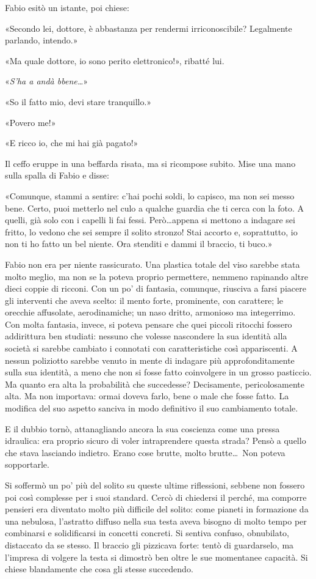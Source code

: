 Fabio esitò un istante, poi chiese:

«Secondo lei, dottore, è abbastanza per rendermi irriconoscibile? Legalmente parlando, intendo.»

«Ma quale dottore, io sono perito elettronico!», ribatté lui.

«\textit{S'ha a andà bbene\ldots}»

«So il fatto mio, devi stare tranquillo.»

«Povero me!»

«E ricco io, che mi hai già pagato!»

Il ceffo eruppe in una beffarda risata, ma si ricompose subito. Mise una mano sulla spalla di Fabio e disse:

«Comunque, stammi a sentire: c'hai pochi soldi, lo capisco, ma non sei messo bene. Certo, puoi metterlo nel culo a qualche guardia che ti cerca con la foto. A quelli, già solo con i capelli li fai fessi. Però\ldots appena si mettono a indagare sei fritto, lo vedono che sei sempre il solito stronzo! Stai accorto e, soprattutto, io non ti ho fatto un bel niente. Ora stenditi e dammi il braccio, ti buco.»

Fabio non era per niente rassicurato. Una plastica totale del viso sarebbe stata molto meglio, ma non se la poteva proprio permettere, nemmeno rapinando altre dieci coppie di ricconi. Con un po' di fantasia, comunque, riusciva a farsi piacere gli interventi che aveva scelto: il mento forte, prominente, con carattere; le orecchie affusolate, aerodinamiche; un naso dritto, armonioso ma integerrimo. Con molta fantasia, invece, si poteva pensare che quei piccoli ritocchi fossero addirittura ben studiati: nessuno che volesse nascondere la sua identità alla società si sarebbe cambiato i connotati con caratteristiche così appariscenti. A nessun poliziotto sarebbe venuto in mente di indagare più approfonditamente sulla sua identità, a meno che non si fosse fatto coinvolgere in un grosso pasticcio. Ma quanto era alta la probabilità che succedesse? Decisamente, pericolosamente alta. Ma non importava: ormai doveva farlo, bene o male che fosse fatto. La modifica del suo aspetto sanciva in modo definitivo il suo cambiamento totale.

E il dubbio tornò, attanagliando ancora la sua coscienza come una pressa idraulica: era proprio sicuro di voler intraprendere questa strada? Pensò a quello che stava lasciando indietro. Erano cose brutte, molto brutte\ldots\ Non poteva sopportarle.

Si soffermò un po' più del solito su queste ultime riflessioni, sebbene non fossero poi così complesse per i suoi standard. Cercò di chiedersi il perché, ma comporre pensieri era diventato molto più difficile del solito: come pianeti in formazione da una nebulosa, l'astratto diffuso nella sua testa aveva bisogno di molto tempo per combinarsi e solidificarsi in concetti concreti. Si sentiva confuso, obnubilato, distaccato da se stesso. Il braccio gli pizzicava forte: tentò di guardarselo, ma l'impresa di volgere la testa si dimostrò ben oltre le sue momentanee capacità. Si chiese blandamente che cosa gli stesse succedendo.

